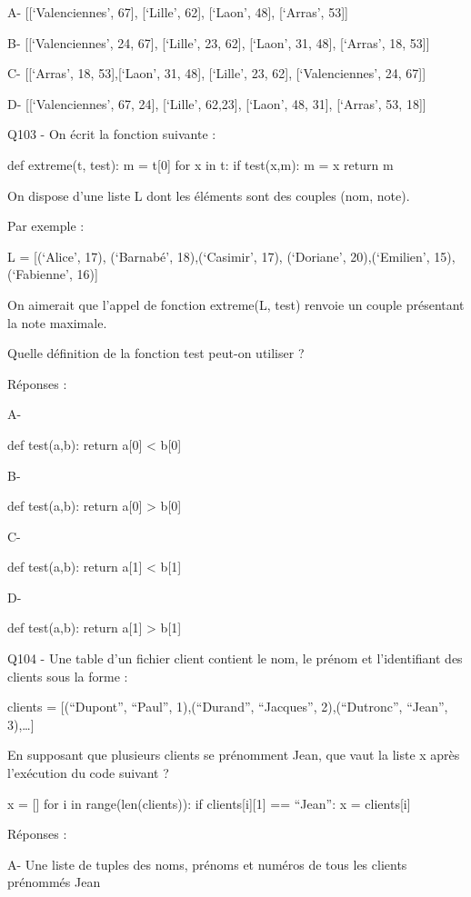 \documentclass[
]{book}
\begin{document}
A- {[}{[}`Valenciennes', 67{]}, {[}`Lille', 62{]}, {[}`Laon', 48{]}, {[}`Arras', 53{]}{]}

B- {[}{[}`Valenciennes', 24, 67{]}, {[}`Lille', 23, 62{]}, {[}`Laon', 31, 48{]}, {[}`Arras', 18, 53{]}{]}

C- {[}{[}`Arras', 18, 53{]},{[}`Laon', 31, 48{]}, {[}`Lille', 23, 62{]}, {[}`Valenciennes', 24, 67{]}{]}

D- {[}{[}`Valenciennes', 67, 24{]}, {[}`Lille', 62,23{]}, {[}`Laon', 48, 31{]}, {[}`Arras', 53, 18{]}{]}

Q103 - On écrit la fonction suivante :

def extreme(t, test):
m = t{[}0{]}
for x in t:
if test(x,m):
m = x
return m

On dispose d'une liste L dont les éléments sont des couples (nom, note).

Par exemple :

L = {[}(`Alice', 17), (`Barnabé', 18),(`Casimir', 17), (`Doriane', 20),(`Emilien', 15), (`Fabienne', 16){]}

On aimerait que l'appel de fonction extreme(L, test) renvoie un couple présentant la note maximale.

Quelle définition de la fonction test peut-on utiliser ?

Réponses :

A-

def test(a,b):
return a{[}0{]} \textless{} b{[}0{]}

B-

def test(a,b):
return a{[}0{]} \textgreater{} b{[}0{]}

C-

def test(a,b):
return a{[}1{]} \textless{} b{[}1{]}

D-

def test(a,b):
return a{[}1{]} \textgreater{} b{[}1{]}

Q104 - Une table d'un fichier client contient le nom, le prénom et l'identifiant des clients sous la forme :

clients = {[}(``Dupont'', ``Paul'', 1),(``Durand'', ``Jacques'', 2),(``Dutronc'', ``Jean'', 3),\ldots{]}

En supposant que plusieurs clients se prénomment Jean, que vaut la liste x après l'exécution du code suivant ?

x = {[}{]}
for i in range(len(clients)):
if clients{[}i{]}{[}1{]} == ``Jean'':
x = clients{[}i{]}

Réponses :

A- Une liste de tuples des noms, prénoms et numéros de tous les clients prénommés Jean
\end{document}
